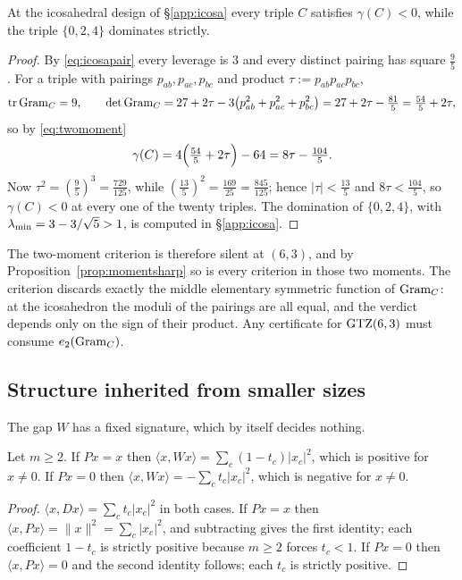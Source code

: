 \begin{proposition}[Lean]\label{prop:icosa}
At the icosahedral design of \S\ref{app:icosa} every triple $C$ satisfies
$\gamma(C)<0$, while the triple $\{0,2,4\}$ dominates strictly.
\end{proposition}

\begin{proof}
By \eqref{eq:icosapair} every leverage is $3$ and every distinct pairing has
square $\tfrac95$.  For a triple with pairings $p_{ab},p_{ac},p_{bc}$ and
product $\tau:=p_{ab}p_{ac}p_{bc}$,
\[
  \operatorname{tr}\operatorname{Gram}_C=9,
  \qquad
  \det\operatorname{Gram}_C=27+2\tau-3\bigl(p_{ab}^2+p_{ac}^2+p_{bc}^2\bigr)
             =27+2\tau-\tfrac{81}5=\tfrac{54}5+2\tau ,
\]
so by \eqref{eq:twomoment}
\[
  \gamma(C)=4\Bigl(\tfrac{54}5+2\tau\Bigr)-64=8\tau-\tfrac{104}5 .
\]
Now $\tau^2=(\tfrac95)^3=\tfrac{729}{125}$, while $(\tfrac{13}5)^2
=\tfrac{169}{25}=\tfrac{845}{125}$; hence $\lvert\tau\rvert<\tfrac{13}5$ and
$8\tau<\tfrac{104}5$, so $\gamma(C)<0$ at every one of the twenty triples.  The
domination of $\{0,2,4\}$, with $\lambda_{\min}=3-3/\sqrt5>1$, is computed in
\S\ref{app:icosa}.
\end{proof}

The two-moment criterion is therefore silent at $(6,3)$, and by
Proposition~\ref{prop:momentsharp} so is every criterion in those two moments.
The criterion discards exactly the middle elementary symmetric function
of $\operatorname{Gram}_C$: at the icosahedron the moduli of the pairings are all equal, and
the verdict depends only on the sign of their product.  Any certificate for
$\mathrm{GTZ}(6,3)$ must consume $e_2(\operatorname{Gram}_C)$.

\subsection{Structure inherited from smaller sizes}\label{app:structure}

The gap $W$ has a fixed signature, which by itself decides nothing.

\begin{lemma}[Lean]\label{lem:rayleigh}
Let $m\ge2$.  If $Px=x$ then
$\langle x,Wx\rangle=\sum_c(1-t_c)\lvert x_c\rvert^2$, which is positive
for $x\ne0$.  If $Px=0$ then
$\langle x,Wx\rangle=-\sum_ct_c\lvert x_c\rvert^2$, which is negative for
$x\ne0$.
\end{lemma}

\begin{proof}
$\langle x,Dx\rangle=\sum_ct_c\lvert x_c\rvert^2$ in both cases.  If
$Px=x$ then $\langle x,Px\rangle=\lVert x\rVert^2=\sum_c\lvert
x_c\rvert^2$, and subtracting gives the first identity; each coefficient
$1-t_c$ is strictly positive because $m\ge2$ forces $t_c<1$.  If $Px=0$
then $\langle x,Px\rangle=0$ and the second identity follows; each $t_c$
is strictly positive.
\end{proof}

